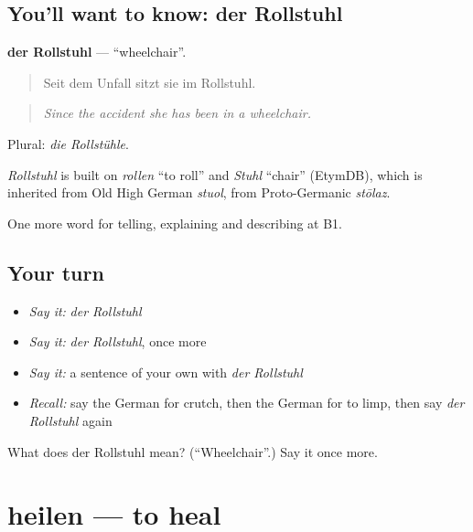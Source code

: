 \subsection*{You'll want to know: der Rollstuhl}
\textbf{der Rollstuhl} — \textquotedblleft{}wheelchair\textquotedblright{}.

\begin{quote}
Seit dem Unfall sitzt sie im Rollstuhl.
\end{quote}

\begin{quote}
\emph{Since the accident she has been in a wheelchair.}
\end{quote}

Plural: \emph{die Rollstühle}.

\begin{cousinweb}
\emph{Rollstuhl} is built on \emph{rollen} \textquotedblleft{}to roll\textquotedblright{} and \emph{Stuhl} \textquotedblleft{}chair\textquotedblright{} (EtymDB), which is inherited from Old High German \emph{stuol}, from Proto-Germanic \emph{stōlaz}.
\end{cousinweb}

\begin{grammarlens}[title={What you've built}]
One more word for telling, explaining and describing at B1.
\end{grammarlens}

\subsection*{Your turn}
\begin{itemize}
\raggedright
  \item \emph{Say it:} \emph{der Rollstuhl}
  \item \emph{Say it:} \emph{der Rollstuhl}, once more
  \item \emph{Say it:} a sentence of your own with \emph{der Rollstuhl}
  \item \emph{Recall:} say the German for crutch, then the German for to limp, then say \emph{der Rollstuhl} again
\end{itemize}

\begin{tcolorbox}[breakable,colback=teal!4,colframe=teal!35!black,title={Before you move on}]
What does der Rollstuhl mean? (\textquotedblleft{}Wheelchair\textquotedblright{}.) Say it once more.
\end{tcolorbox}
\section[heilen]{heilen — to heal}

